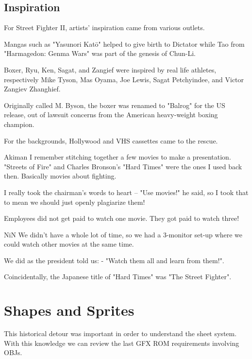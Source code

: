 \subsection{Inspiration}
For Street Fighter II, artists' inspiration came from various outlets. 

Mangas such as "Yasunori Katō" helped to give birth to Dictator while Tao from "Harmagedon: Genma Wars" was part of the genesis of Chun-Li. 

Boxer, Ryu, Ken, Sagat, and Zangief were inspired by real life athletes, respectively Mike Tyson, Mas Oyama, Joe Lewis, Sagat Petchyindee, and Victor Zangiev Zhanghief.

\begin{trivia}
Originally called M. Byson, the boxer was renamed to "Balrog" for the US release, out of lawsuit concerns from the American heavy-weight boxing champion. 
\end{trivia}

For the backgrounds, Hollywood and VHS cassettes came to the rescue.

\begin{q}{Akiman\cite{ffdevinterview}}
I remember stitching together a few movies to make a presentation. "Streets of Fire" and Charles Bronson’s "Hard Times" were the ones I used back then. Basically movies about fighting. 

I really took the chairman’s words to heart – "Use movies!" he said, so I took that to mean we should just openly plagiarize them!
\end{q}

Employees did not get paid to watch one movie. They got paid to watch three!

\begin{q}{NiN\cite{ffdevinterview}}
We didn't have a whole lot of time, so we had a 3-monitor set-up where we could watch other movies at the same time.

We did as the president told us: - "Watch them all and learn from them!".
\end{q}

\begin{trivia}
Coincidentally, the Japanese title of "Hard Times" was "The Street Fighter".
\end{trivia}


\section{Shapes and Sprites}
This historical detour was important in order to understand the sheet system. With this knowledge we can review the last GFX ROM requirements involving OBJs.  

